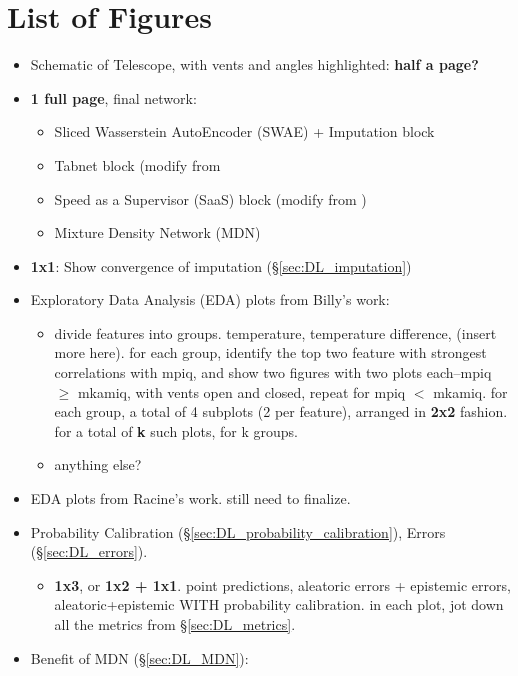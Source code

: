 
\section{List of Figures}\label{sec:list_of_figures}
\begin{itemize}
    \item Schematic of Telescope, with vents and angles highlighted: \textbf{half a page?}
    \item \textbf{1 full page}, final network:
    \begin{itemize}
        \item Sliced Wasserstein AutoEncoder (SWAE) + Imputation block
        \item Tabnet block (modify from \cite{tabnet}
        \item Speed as a Supervisor (SaaS) block (modify from \cite{saas2})
        \item Mixture Density Network (MDN)
    \end{itemize}
    \item \textbf{1x1}: Show convergence of imputation (\S\ref{sec:DL_imputation})
    \item Exploratory Data Analysis (EDA) plots from Billy's work:
    \begin{itemize}
        \item divide features into groups. temperature, temperature difference, (insert more here). for each group, identify the top two feature with strongest correlations with mpiq, and show two figures with two plots each--mpiq $\ge$ mkamiq, with vents open and closed, repeat for mpiq $<$ mkamiq. for each group, a total of 4 subplots (2 per feature), arranged in \textbf{2x2} fashion. for a total of \textbf{k} such plots, for k groups.
        \item anything else?
    \end{itemize}
    \item EDA plots from Racine's work. still need to finalize.
    \item Probability Calibration (\S\ref{sec:DL_probability_calibration}), Errors (\S\ref{sec:DL_errors}).
    \begin{itemize}
        \item \textbf{1x3}, or \textbf{1x2 + 1x1}. point predictions, aleatoric errors + epistemic errors, aleatoric+epistemic WITH probability calibration. in each plot, jot down all the metrics from \S\ref{sec:DL_metrics}.
    \end{itemize}
    \item Benefit of MDN (\S\ref{sec:DL_MDN}):

\end{itemize}
